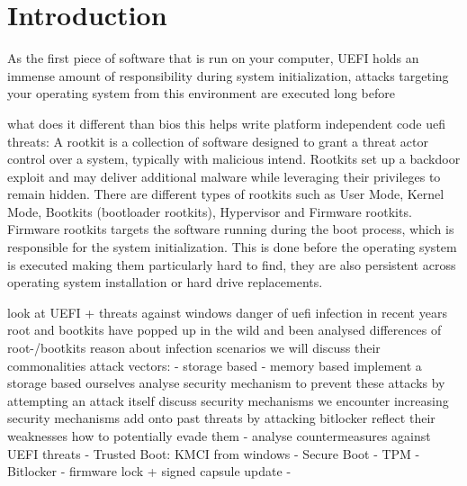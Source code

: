 

\chapter{Introduction}


As the first piece of software that is run on your computer, UEFI holds an immense amount of responsibility during system initialization, attacks targeting your operating system from this environment are executed long before

what does it different than bios
this helps write platform independent code
uefi threats:
A rootkit is a collection of software designed to grant a threat actor control over a system, typically with malicious intend.
Rootkits set up a backdoor exploit and may deliver additional malware while leveraging their privileges to remain hidden.
There are different types of rootkits such as User Mode, Kernel Mode, Bootkits (bootloader rootkits), Hypervisor and Firmware rootkits.
\cite{microsoft-secure-the-windows-boot-process}
\cite{crowdstrike, techtarget}
Firmware rootkits targets the software running during the boot process, which is responsible for the system initialization.
This is done before the operating system is executed making them particularly hard to find, they are also persistent across operating system installation or hard drive replacements.
\cite{crowdstrike}


look at UEFI + threats against windows
danger of uefi infection
in recent years root and bootkits have popped up in the wild and been analysed
differences of root-/bootkits
reason about infection scenarios
we will discuss their commonalities
attack vectors:
- storage based
- memory based
implement a storage based ourselves
analyse security mechanism to prevent these attacks by attempting an attack itself
discuss security mechanisms we encounter
increasing security mechanisms
add onto past threats by attacking bitlocker
reflect their weaknesses
how to potentially evade them
- analyse countermeasures against UEFI threats
- Trusted Boot: KMCI from windows
- Secure Boot
- TPM
- Bitlocker
- firmware lock + signed capsule update
-



